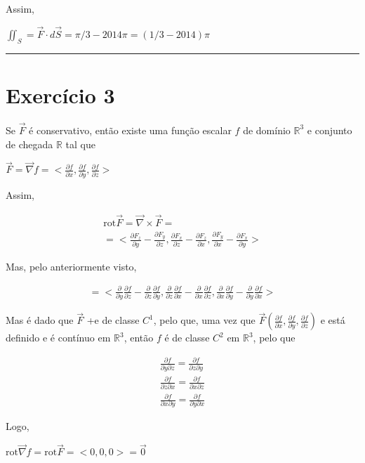 \documentclass{article}
\newcommand{\R}[0]{\mathbb{R}}
\newcommand{\dS}[0]{d \vec{S}}
\newcommand{\vF}[0]{\vec{F}}
\newcommand{\partialFrac}[2]{\frac{\partial #1}{\partial #2}}
\newcommand{\grad}[1]{\vec{\nabla}#1}
\newcommand{\rot}[1]{\textrm{rot} #1}
\newcommand{\ppartialFrac}[3]{\frac{\partial #1}{\partial #2 \partial #3}}
\begin{document}
\vspace{5mm}

Assim,

\begin{center}
$\iint_S = \vF \cdot \dS = \pi/3 - 2014 \pi = (1/3 - 2014) \pi$
\end{center}

\vspace{5mm}

\rule{\textwidth}{0.4pt}

\vspace{5mm}

\section{Exercício 3}

Se $\vF$ é conservativo, então existe uma função escalar $f$ de
domínio $\R^3$ e conjunto de chegada $\R$ tal que

\begin{center}
$\vF = \grad{f} = <\partialFrac{f}{x}, \partialFrac{f}{y}, \partialFrac{f}{z}>$
\end{center}

Assim,

\begin{gather*}
\rot{\vF} = \vec{\nabla} \times \vF =\\
= <\partialFrac{F_z}{y} - \partialFrac{F_y}{z}, \partialFrac{F_x}{z} - \partialFrac{F_z}{x}, \partialFrac{F_y}{x} - \partialFrac{F_x}{y}>
\end{gather*}

Mas, pelo anteriormente visto,

\begin{gather*}
= <\partialFrac{}{y}\partialFrac{f}{z} - \partialFrac{}{z}\partialFrac{f}{y}, \partialFrac{}{z}\partialFrac{f}{x} - \partialFrac{}{x}\partialFrac{f}{z}, \partialFrac{}{x}\partialFrac{f}{y} - \partialFrac{}{y}\partialFrac{f}{x}>
\end{gather*}

Mas é dado que $\vF$ +e de classe $C^1$, pelo que, uma vez que
$\vF(\partialFrac{f}{x}, \partialFrac{f}{y}, \partialFrac{f}{z})$
e está definido e é contínuo em $\R^3$, então $f$ é de classe $C^2$
em $\R^3$, pelo que

\begin{gather*}
\ppartialFrac{f}{y}{z} = \ppartialFrac{f}{z}{y}\\
\ppartialFrac{f}{z}{x} = \ppartialFrac{f}{x}{z}\\
\ppartialFrac{f}{x}{y} = \ppartialFrac{f}{y}{x}
\end{gather*}

Logo,

\begin{center}
$\rot{\grad{f}} = \rot{\vF} = <0,0,0> = \vec{0}$
\end{center}
\end{document}

